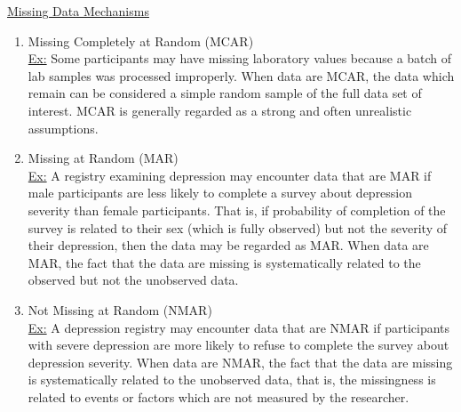 \documentclass[12pt]{article}
\begin{document}
\begin{enumerate}

\begin{tcolorbox}[colback=white, sharp corners]
\begin{center}
\underline{Missing Data Mechanisms}
\begin{enumerate}
\item[(1)] Missing Completely at Random (MCAR) \\
	\underline{Ex:} Some participants may have missing laboratory values because a batch of lab samples was processed improperly. When data are MCAR, the data which remain can be considered a simple random sample of the full data set of interest. MCAR is generally regarded as a strong and often unrealistic assumptions.
\item[(2)] Missing at Random (MAR) \\
	\underline{Ex:}  A registry examining depression may encounter data that are MAR if male participants are less likely to complete a survey about depression severity than female participants. That is, if probability of completion of the survey is related to their sex (which is fully observed) but not the severity of their depression, then the data may be regarded as MAR. When data are MAR, the fact that the data are missing is systematically related to the observed but not the unobserved data.
\item[(3)] Not Missing at Random (NMAR) \\
	\underline{Ex:}  A depression registry may encounter data that are NMAR if participants with severe depression are more likely to refuse to complete the survey about depression severity. When data are NMAR, the fact that the data are missing is systematically related to the unobserved data, that is, the missingness is related to events or factors which are not measured by the researcher. 
\end{enumerate}
\end{center}
\end{tcolorbox}



\end{enumerate}
\end{document}
